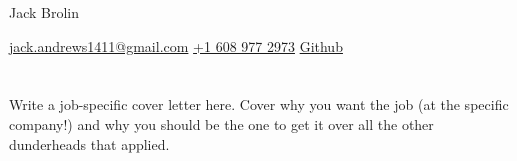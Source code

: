 \documentclass[11pt]{article}
\begin{document}
\begin{center}      
    {\fontsize{20}{20}\selectfont Jack Brolin} \\ \bigskip

    {\color{icnclr}\faEnvelope[regular]} \href{mailto:myaname@email.com}{jack.andrews1411@gmail.com} \qquad
    {\color{icnclr}} \href{tel:+920000000000}{+1 608 977 2973} \qquad
    {\color{icnclr}\faGithub} \href{https://github.com/draco1411}{Github}
    
\end{center}

\section{}

Write a job-specific cover letter here. Cover why you want the job (at the specific company!) and why you should be the one to get it 
over all the other dunderheads that applied. 
\end{document}
